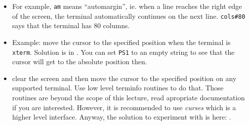 \begin{itemize}
\item For example, \texttt{am} means ``automargin'', ie. when a line reaches the
right edge of the screen, the terminal automatically continues on the next line.
\texttt{cols\#80} says that the terminal has 80 columns.
\item Example: move the cursor to the specified position when the terminal is
\texttt{xterm}. Solution is in .
You can set \texttt{PS1} to an empty string to see that the cursor will get to
the absolute position then.
\item {} clear the screen and then move the cursor to the
specified position on any supported terminal. Use low level terminfo routines to
do that. Those routines are beyond the scope of this lecture, read apropriate
documentation if you are interested. However, it is recommended to use
\emph{curses} which is a higher level interface. Anyway, the solution to
experiment with is here: .
\end{itemize}

\endinput
